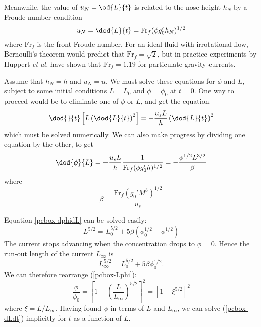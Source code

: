 Meanwhile, the value of $u_N = \od{L}{t}$ is related to the nose height $h_N$ by a Froude number condition
\begin{equation}
u_N = \dod{L}{t} = \mathrm{Fr}_f (\phi g_0' h_N)^{1/2} 
 \label{pcbox-dLdt}
\end{equation}
where $\mathrm{Fr}_f$ is the front Froude number. For an ideal fluid with irrotational flow, Bernoulli's theorem would predict that $\mathrm{Fr}_f = \sqrt{2}$, but in practice experiments by Huppert \textit{et al.} have shown that $\mathrm{Fr}_f = 1.19$ for particulate gravity currents. 

Assume that $h_N = h$ and $u_N = u$. We must solve these equations for $\phi$ and $L$, subject to some initial conditions $L=L_0$ and $\phi=\phi_0$ at $t=0$. One way to proceed would be to eliminate one of $\phi$ or $L$, and get the equation
\begin{equation}
 \dod{}{t}\left[ L\left( \dod{L}{t}\right)^2 \right] = -\frac{u_s L}{h} \left(\dod{L}{t}\right)^2
\end{equation}
which must be solved numerically. We can also make progress by dividing one equation by the other, to get
\begin{equation}
\dod{\phi}{L} = -\frac{u_s L}{h} \frac{1}{\mathrm{Fr}_f (\phi g_0' h)^{1/2}} = -\frac{\phi^{1/2} L^{3/2}}{\beta} 
 \label{pcbox-dphidL}
\end{equation}
where
\begin{equation}
\beta = \frac{\mathrm{Fr}_f (g_0' M^3)^{1/2}}{u_s}
\end{equation}

Equation \ref{pcbox-dphidL} can be solved easily:
\begin{equation}
 L^{5/2} =  L_0^{5/2} + 5\beta \left(\phi_0^{1/2} - \phi^{1/2} \right) 
 \label{pcbox-Lphi}
\end{equation}
The current stops advancing when the concentration drops to $\phi = 0$. Hence the run-out length of the current $L_\infty$ is
\begin{equation}
 L_\infty^{5/2} =  L_0^{5/2} + 5\beta \phi_0^{1/2}.
\end{equation}
We can therefore rearrange (\ref{pcbox-Lphi}):
\begin{equation}
 \frac{\phi}{\phi_0} = \left[ 1-\left(\frac{L}{L_\infty}\right)^{5/2} \right]^2 = \left[ 1 - \xi^{5/2} \right]^2
\end{equation}
where $\xi = L/L_\infty$. 
Having found $\phi$ in terms of $L$ and $L_\infty$, we can solve (\ref{pcbox-dLdt}) implicitly for $t$ as a function of $L$. 

